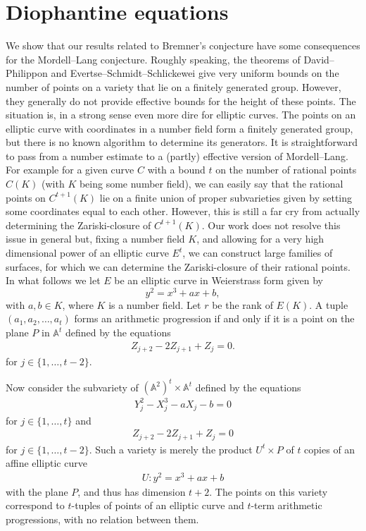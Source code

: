 \documentclass[12pt, reqno]{amsart}
\theoremstyle{remark}
\theoremstyle{definition}
\numberwithin{equation}{section}
\begin{document}
\section{Diophantine equations } \label{appa}
We show that our results related to Bremner's conjecture have some consequences for the Mordell--Lang conjecture. Roughly speaking, the theorems of David--Philippon and Evertse--Schmidt--Schlickewei give very uniform bounds on the number of points on a variety that lie on a finitely generated group. However, they generally do not provide effective bounds for the height of these points. The situation is, in a strong sense even more dire for elliptic curves. The points on an elliptic curve with coordinates in a number field form a finitely generated group, but there is no known algorithm to determine its generators. It is straightforward to pass from a number estimate to a (partly) effective version of Mordell--Lang. For example for a given curve $C$ with a bound $t$ on the number of rational points $C(K)$ (with $K$ being some number field), we can easily say that the rational points on $C^{t+1}(K)$ lie on a finite union of proper subvarieties given by setting some coordinates equal to each other. However, this is still a far cry from actually determining the Zariski-closure of $C^{t + 1}(K)$. 
Our work does not resolve this issue in general but, fixing a number field $K$, and allowing for a very high dimensional power of an elliptic curve $E^t$, we can construct large families of surfaces, for which we can determine the Zariski-closure of their rational points.   
In what follows we let $E$ be an elliptic curve in  Weierstrass form given by
$$ y^2 = x^3 + ax+ b,$$
with $a,b \in K$, where $K$ is a number field. Let $r$ be the rank of $E(K)$.  
 A tuple $(a_1, a_2, \dots, a_t)$ forms an arithmetic progression if and only if it is a point on the plane $P$ in $\mathbb{A}^t$ defined by the equations
\begin{align}
    Z_{j + 2} - 2Z_{j + 1} + 
    Z_j = 0. \label{arith}
\end{align}
for $j \in \{1, \dots, t - 2\}$.

Now consider the subvariety of $(\mathbb{A}^2)^t \times \mathbb{A}^t$ defined by the equations
\begin{align*}
    Y_j^2 - X_j^3 - aX_j - b = 0
\end{align*}
for $j \in \{1, \dots, t\}$ and
\begin{align*}
    Z_{j + 2} - 2Z_{j + 1} 
    + Z_j = 0
\end{align*}
for $j \in \{1, \dots, t - 2\}$. Such a variety is merely the product $U^t \times P$ of $t$ copies of an affine elliptic curve
\begin{align*}
    U : y^2 = x^3 + ax + b
\end{align*}
with the plane $P$, and thus has dimension $t + 2$. The points on this variety correspond to $t$-tuples of points of an elliptic curve and $t$-term arithmetic progressions, with no relation between them.
\end{document}

